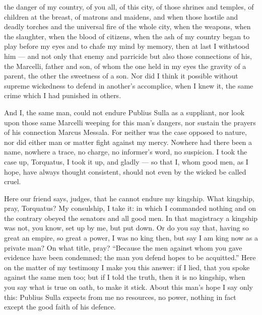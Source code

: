  the danger of my country, of you all, of this city, of those shrines and temples, of children at the breast, of matrons and maidens, and when those hostile and deadly torches and the universal fire of the whole city, when the weapons, when the slaughter, when the blood of citizens, when the ash of my country began to play before my eyes and to chafe my mind by memory, then at last I withstood him --- and not only that enemy and parricide but also those connections of his, the Marcelli, father and son, of whom the one held in my eyes the gravity of a parent, the other the sweetness of a son. Nor did I think it possible without supreme wickedness to defend in another's accomplice, when I knew it, the same crime which I had punished in others.

 And I, the same man, could not endure Publius Sulla as a suppliant, nor look upon those same Marcelli weeping for this man's dangers, nor sustain the prayers of his connection Marcus Messala. For neither was the case opposed to nature, nor did either man or matter fight against my mercy. Nowhere had there been a name, nowhere a trace, no charge, no informer's word, no suspicion. I took the case up, Torquatus, I took it up, and gladly --- so that I, whom good men, as I hope, have always thought consistent, should not even by the wicked be called cruel.

 Here our friend says, judges, that he cannot endure my kingship. What kingship, pray, Torquatus? My consulship, I take it: in which I commanded nothing and on the contrary obeyed the senators and all good men. In that magistracy a kingship was not, you know, set up by me, but put down. Or do you say that, having so great an empire, so great a power, I was no king then, but say I am king now as a private man? On what title, pray? ``Because the men against whom you gave evidence have been condemned; the man you defend hopes to be acquitted.'' Here on the matter of my testimony I make you this answer: if I lied, that you spoke against the same men too; but if I told the truth, then it is no kingship, when you say what is true on oath, to make it stick. About this man's hope I say only this: Publius Sulla expects from me no resources, no power, nothing in fact except the good faith of his defence.

